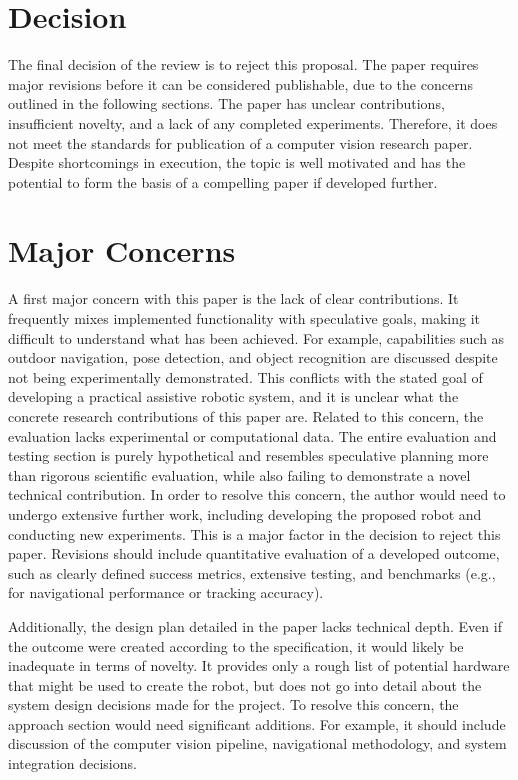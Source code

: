 \documentclass{article}
\theoremstyle{definition}
\begin{document}
\section{Decision}
The final decision of the review is to reject this proposal.
The paper requires major revisions before it can be considered publishable, 
due to the concerns outlined in the following sections.
The paper has unclear contributions, insufficient novelty, and a lack of any completed experiments.
Therefore, it does not meet the standards for publication of a computer vision research paper.
Despite shortcomings in execution,
the topic is well motivated and has the potential to form the basis of a compelling paper if developed further.

\section{Major Concerns}


A first major concern with this paper is the lack of clear contributions.
It frequently mixes implemented functionality with speculative goals,
making it difficult to understand what has been achieved.
For example, capabilities such as outdoor navigation, pose detection, and object recognition
are discussed despite not being experimentally demonstrated.
This conflicts with the stated goal of developing a practical assistive robotic system,
and it is unclear what the concrete research contributions of this paper are.
Related to this concern, the evaluation lacks experimental or computational data.
The entire evaluation and testing section is purely hypothetical and resembles speculative planning more than rigorous scientific evaluation,
while also failing to demonstrate a novel technical contribution.
In order to resolve this concern, the author would need to undergo extensive further work,
including developing the proposed robot and conducting new experiments. 
This is a major factor in the decision to reject this paper.
Revisions should include quantitative evaluation of a developed outcome, such as clearly defined success metrics,
extensive testing, and benchmarks (e.g., for navigational performance or tracking accuracy).


Additionally, the design plan detailed in the paper lacks technical depth.
Even if the outcome were created according to the specification,
it would likely be inadequate in terms of novelty.
It provides only a rough list of potential hardware that might be used to create the robot,
but does not go into detail about the system design decisions made for the project.
To resolve this concern, the approach section would need significant additions.
For example, it should include discussion of the computer vision pipeline,
navigational methodology, and system integration decisions.
\end{document}

